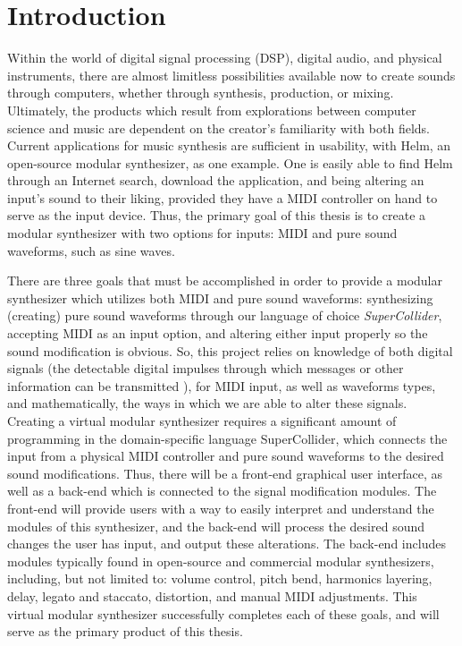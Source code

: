\chapter{Introduction}\label{chapter:intro}

Within the world of digital signal processing (DSP), digital audio, and physical instruments, there are almost limitless possibilities available now to create sounds through computers, whether through synthesis, production, or mixing. Ultimately, the products which result from explorations between computer science and music are dependent on the creator's familiarity with both fields. Current applications for music synthesis are sufficient in usability, with Helm, an open-source modular synthesizer, as one example. One is easily able to find Helm through an Internet search, download the application, and being altering an input's sound to their liking, provided they have a MIDI controller on hand to serve as the input device. Thus, the primary goal of this thesis is to create a modular synthesizer with two options for inputs: MIDI and pure sound waveforms, such as sine waves. 

There are three goals that must be accomplished in order to provide a modular synthesizer which utilizes both MIDI and pure sound waveforms: synthesizing (creating) pure sound waveforms through our language of choice \textit{SuperCollider}, accepting MIDI as an input option, and altering either input properly so the sound modification is obvious. So, this project relies on knowledge of both digital signals (the detectable digital impulses through which messages or other information can be transmitted \cite{Rosen_Howell_2011}), for MIDI input, as well as waveforms types, and mathematically, the ways in which we are able to alter these signals. Creating a virtual modular synthesizer requires a significant amount of programming in the domain-specific language SuperCollider, which connects the input from a physical MIDI controller and pure sound waveforms to the desired sound modifications. Thus, there will be a front-end graphical user interface, as well as a back-end which is connected to the signal modification modules. The front-end will provide users with a way to easily interpret and understand the modules of this synthesizer, and the back-end will process the desired sound changes the user has input, and output these alterations. The back-end includes modules typically found in open-source and commercial modular synthesizers, including, but not limited to: volume control, pitch bend, harmonics layering, delay, legato and staccato, distortion, and manual MIDI adjustments. This virtual modular synthesizer successfully completes each of these goals, and will serve as the primary product of this thesis.

